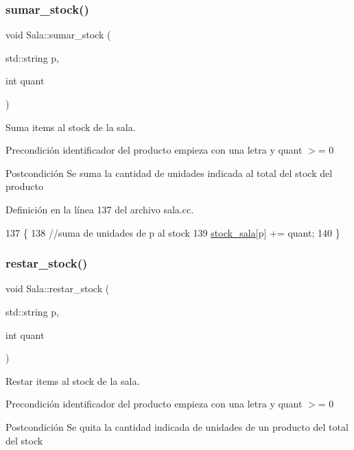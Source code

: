 \subsubsection{\texorpdfstring{sumar\+\_\+stock()}{sumar\_stock()}}
{\footnotesize\ttfamily void Sala\+::sumar\+\_\+stock (\begin{DoxyParamCaption}\item[{std\+::string}]{p,  }\item[{int}]{quant }\end{DoxyParamCaption})}



Suma items al stock de la sala. 

\begin{DoxyPrecond}{Precondición}
identificador del producto empieza con una letra y quant $>$= 0 
\end{DoxyPrecond}
\begin{DoxyPostcond}{Postcondición}
Se suma la cantidad de unidades indicada al total del stock del producto 
\end{DoxyPostcond}


Definición en la línea 137 del archivo sala.\+cc.


\begin{DoxyCode}
137                                           \{
138     \textcolor{comment}{//suma de unidades de p al stock}
139     \mbox{\hyperlink{class_sala_a7c9511997ba4a6fac93625fd3f5c7703}{stock\_sala}}[p] += quant;
140 \}
\end{DoxyCode}
\mbox{\label{class_sala_a3f2485d40f7d90ca5eb8142dbadd5993}} 
\subsubsection{\texorpdfstring{restar\+\_\+stock()}{restar\_stock()}}
{\footnotesize\ttfamily void Sala\+::restar\+\_\+stock (\begin{DoxyParamCaption}\item[{std\+::string}]{p,  }\item[{int}]{quant }\end{DoxyParamCaption})}



Restar items al stock de la sala. 

\begin{DoxyPrecond}{Precondición}
identificador del producto empieza con una letra y quant $>$= 0 
\end{DoxyPrecond}
\begin{DoxyPostcond}{Postcondición}
Se quita la cantidad indicada de unidades de un producto del total del stock 
\end{DoxyPostcond}


